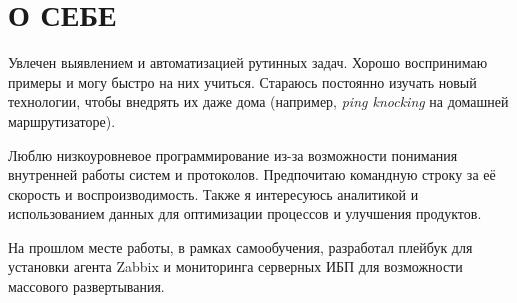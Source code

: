 \section{О СЕБЕ}

Увлечен выявлением и автоматизацией рутинных задач. Хорошо воспринимаю
примеры и могу быстро на них учиться. Стараюсь постоянно изучать новый
технологии, чтобы внедрять их даже дома (например, \textit{ping
  knocking} на домашней маршрутизаторе).

Люблю низкоуровневое программирование из-за возможности понимания
внутренней работы систем и протоколов. Предпочитаю командную строку за
её скорость и воспроизводимость. Также я интересуюсь аналитикой и
использованием данных для оптимизации процессов и улучшения продуктов.

На прошлом месте работы, в рамках самообучения, разработал плейбук для
установки агента Zabbix и мониторинга серверных ИБП для возможности
массового развертывания.


